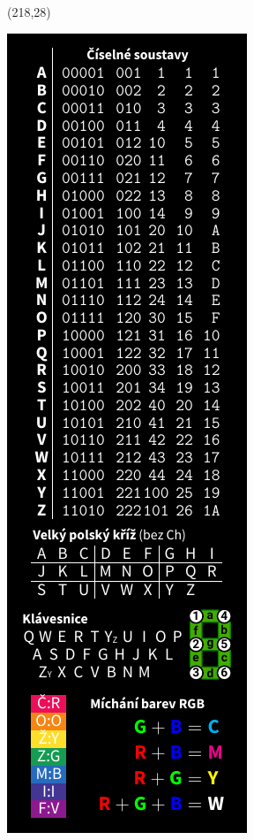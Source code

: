 \documentclass{extarticle}
\begin{document}
\begin{textblock}{42}(218,28)
\vfill
{\centerline{\includegraphics[scale=1,]{tools-back.pdf}}} 
\vfill
\end{textblock}
\end{document}
